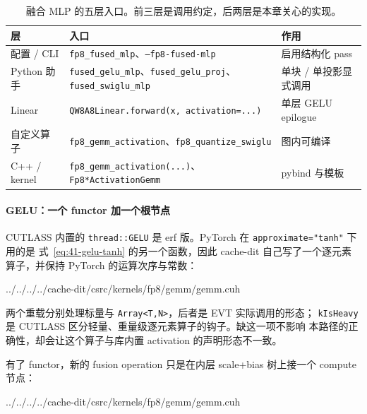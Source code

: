 \begin{table}[H]
\centering\small
\begin{tabular}{lll}
\toprule
层 & 入口 & 作用 \\
\midrule
配置 / CLI & \texttt{fp8\_fused\_mlp}、\texttt{--fp8-fused-mlp} & 启用结构化 pass \\
Python 助手 & \texttt{fused\_gelu\_mlp}、\texttt{fused\_gelu\_proj}、\texttt{fused\_swiglu\_mlp} & 单块 / 单投影显式调用 \\
Linear & \texttt{QW8A8Linear.forward(x, activation=...)} & 单层 GELU epilogue \\
自定义算子 & \texttt{fp8\_gemm\_activation}、\texttt{fp8\_quantize\_swiglu} & 图内可编译 \\
C++ / kernel & \texttt{fp8\_gemm\_activation(...)}、\texttt{Fp8*ActivationGemm} & pybind 与模板 \\
\bottomrule
\end{tabular}
\caption{融合 MLP 的五层入口。前三层是调用约定，后两层是本章关心的实现。}
\label{tab:41-fused-entry}
\end{table}

\paragraph{GELU：一个 functor 加一个根节点}

CUTLASS 内置的 \texttt{thread::GELU} 是 erf 版。PyTorch 在
\texttt{approximate}\allowbreak\texttt{="tanh"} 下用的是
式~\ref{eq:41-gelu-tanh} 的另一个函数，因此 cache-dit 自己写了一个逐元素
算子，并保持 PyTorch 的运算次序与常数：

\begin{lstinputlisting}[linerange={94-122},firstnumber=auto,
  title={cache-dit fp8/gemm/gemm.cuh L94--122（PyTorch 口径的 tanh GELU）}]{../../../../cache-dit/csrc/kernels/fp8/gemm/gemm.cuh}
\end{lstinputlisting}

两个重载分别处理标量与 \texttt{Array<T,N>}，后者是 EVT 实际调用的形态；
\texttt{kIsHeavy} 是 CUTLASS 区分轻量、重量级逐元素算子的钩子。缺这一项不影响
本路径的正确性，却会让这个算子与库内置 activation 的声明形态不一致。

有了 functor，新的 fusion operation 只是在内层 scale+bias 树上接一个 compute
节点：

\begin{lstinputlisting}[linerange={192-214},firstnumber=auto,
  title={cache-dit fp8/gemm/gemm.cuh L192--214（scale+bias 树外再接 activation）}]{../../../../cache-dit/csrc/kernels/fp8/gemm/gemm.cuh}
\end{lstinputlisting}

